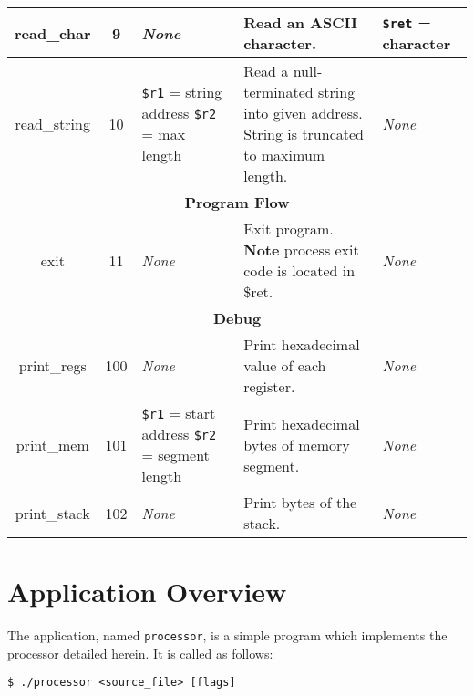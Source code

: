 \documentclass[10pt]{article}
\begin{document}
\begin{longtable}{|c|c|l|l|l|}
        read\_char & 9 & \textit{None} & Read an ASCII character. & \texttt{\$ret} = character \\
        \hline
        read\_string & 10 & \makecell[l]{\texttt{\$r1} = string address\\%
        \texttt{\$r2} = max length} & \makecell[l]{Read a null-terminated string into given address.\\%
        String is truncated to maximum length.} & \textit{None} \\
        \hline \hline
        \multicolumn{5}{|c|}{\textbf{Program Flow}} \\
        \hline
        exit & 11 & \textit{None} & \makecell[l]{Exit program.\\%
        \textbf{Note} process exit code is located in \$ret.} & \textit{None} \\
        \hline \hline
        \multicolumn{5}{|c|}{\textbf{Debug}} \\
        \hline
        print\_regs & 100 & \textit{None} & Print hexadecimal value of each register. & \textit{None} \\
        \hline
        print\_mem & 101 & \makecell[l]{\texttt{\$r1} = start address\\%
        \texttt{\$r2} = segment length} & Print hexadecimal bytes of memory segment. & \textit{None} \\
        \hline
        print\_stack & 102 & \textit{None} & Print bytes of the stack. & \textit{None} \\
        \hline
    \end{longtable}

    \section{Application Overview}

    The application, named \texttt{processor}, is a simple program which implements the processor detailed herein.
    It is called as follows:

    \medskip
    \begin{lstlisting}[style=bashconsole]
$ ./processor <source_file> [flags]
    \end{lstlisting}
\end{document}
